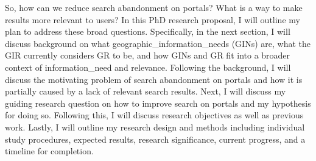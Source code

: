 So, how can we reduce search abandonment on portals? What is a way to make results more relevant to users? In this PhD research proposal, I will outline my plan to address these broad questions. Specifically, in the next section, I will discuss background on what \gls{geographic_information_needs} (\acrshort{GIN}s) are, what the GIR currently considers GR to be, and how GINs and GR fit into a broader context of \gls{information_need} and relevance. Following the background, I will discuss the motivating problem of search abandonment on portals and how it is partially caused by a lack of relevant search results. Next, I will discuss my guiding research question on how to improve search on portals and my hypothesis for doing so. Following this, I will discuss research objectives as well as previous work. Lastly, I will outline my research design and methods including individual study procedures, expected results, research significance, current progress, and a timeline for completion.
